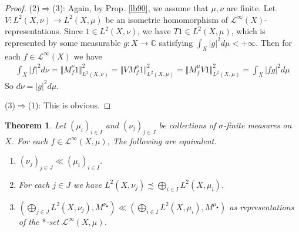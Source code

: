 \documentclass[12pt,b5paper,notitlepage]{article}
\theoremstyle{definition}
\theoremstyle{plain}
\newtheorem{thm}[df]{Theorem}
\newcommand{\mc}{\mathcal}
\newcommand{\blt}{\bullet}
\newcommand{\Cbb}{\mathbb C}
\numberwithin{equation}{section}
\begin{document}
\begin{proof}
(2)$\Rightarrow$(3): Again, by Prop. \ref{lb90}, we assume that $\mu,\nu$ are finite. Let $V:L^2(X,\nu)\rightarrow L^2(X,\mu)$ be an isometric homomorphism of $\mc L^\infty(X)$-representations. Since $1\in L^2(X,\nu)$, we have $T1\in L^2(X,\mu)$, which is represented by some measurable $g:X\rightarrow\Cbb$ satisfying $\int_X|g|^2d\mu<+\infty$. Then for each $f\in\mc L^\infty(X)$ we have
\begin{align*}
\int_X |f|^2d\nu=\Vert M_f^\nu1\Vert_{L^2(X,\nu)}^2=\Vert VM_f^\nu1\Vert_{L^2(X,\mu)}^2=\Vert M_f^\mu V1\Vert_{L^2(X,\mu)}^2=\int_X|fg|^2d\mu
\end{align*}
So $d\nu=|g|^2d\mu$.

(3)$\Rightarrow$(1): This is obvious.
\end{proof}





\begin{thm}\label{lb92}
Let $(\mu_i)_{i\in I}$ and $(\nu_j)_{j\in J}$ be collections of $\sigma$-finite measures on $X$. For each $f\in\mc L^\infty(X,\mu)$, The following are equivalent.
\begin{enumerate}[label=(\arabic*)]
\item $(\nu_j)_{j\in J}\ll (\mu_i)_{i\in I}$.
\item For each $j\in J$ we have $L^2(X,\nu_j)\precsim \bigoplus_{i\in I}L^2(X,\mu_i)$.
\item $(\bigoplus_{j\in J}L^2(X,\nu_j),M^{\nu_\blt})\ll (\bigoplus_{i\in I}L^2(X,\mu_i),M^{\mu_\blt})$ as representations of the $*$-set $\mc L^\infty(X,\mu)$.
\end{enumerate}
\end{thm}
\end{document}
